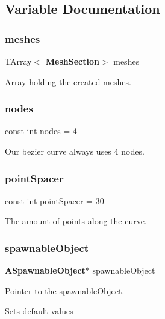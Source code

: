 \subsection{Variable Documentation}
\mbox{\label{_track_generator_bezier_8cpp_a64af1d55023ce43d43db7084953ff882}} 
\subsubsection{meshes}
{\footnotesize\ttfamily T\+Array$<$\textbf{ Mesh\+Section}$>$ meshes}



Array holding the created meshes. 

\mbox{\label{_track_generator_bezier_8cpp_a890397c9ca6722671c6e1ed7635b3925}} 
\subsubsection{nodes}
{\footnotesize\ttfamily const int nodes = 4}



Our bezier curve always uses 4 nodes. 

\mbox{\label{_track_generator_bezier_8cpp_a260ebc0df13e543db68d6dbde6c4700c}} 
\subsubsection{pointSpacer}
{\footnotesize\ttfamily const int point\+Spacer = 30}



The amount of points along the curve. 

\mbox{\label{_track_generator_bezier_8cpp_a0b8aeee4c48b921482309d0e9eb613ec}} 
\subsubsection{spawnableObject}
{\footnotesize\ttfamily \textbf{ A\+Spawnable\+Object}$\ast$ spawnable\+Object}



Pointer to the spawnable\+Object. 

Sets default values 